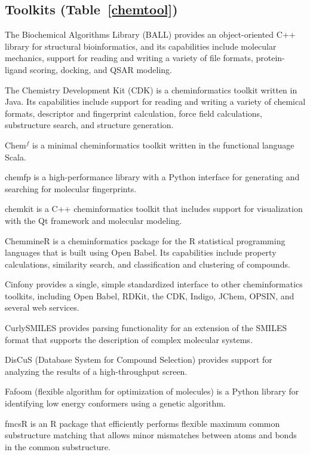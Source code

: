 \subsection*{Toolkits (Table~\ref{chemtool})} 
The Biochemical Algorithms Library (BALL) \cite{Hildebrandt_2010} provides an object-oriented C++ library for structural bioinformatics, and its capabilities include molecular mechanics, support for reading and writing a variety of file formats, protein-ligand scoring, docking, and QSAR modeling.

The Chemistry Development Kit (CDK) \cite{Steinbeck_2006} is a cheminformatics toolkit written in Java.  Its capabilities include support for reading and writing a variety of chemical formats, descriptor and fingerprint calculation, force field calculations, substructure search, and structure generation.

Chem$^f$ \cite{H_ck_2012} is a minimal cheminformatics toolkit written in the functional language Scala.

chemfp \cite{dalke2011chemfp} is a high-performance library with a Python interface for generating and searching for molecular fingerprints.

chemkit is a C++ cheminformatics toolkit that includes support for visualization with the Qt framework and molecular modeling.

ChemmineR \cite{Cao_2008}  is a cheminformatics package for the R statistical programming languages that is built using Open Babel. Its capabilities include property calculations, similarity search, and classification and clustering of compounds.

Cinfony \cite{cinfony} provides a single, simple standardized interface to other cheminformatics toolkits, including Open Babel, RDKit, the CDK, Indigo, JChem, OPSIN, and several web services.

CurlySMILES \cite{Drefahl_2011} provides parsing functionality for an extension of the SMILES format that supports the description of complex molecular systems.

DisCuS (Database System for Compound Selection) \cite{W_jcikowski_2014} provides support for analyzing the results of a high-throughput screen.

Fafoom (flexible algorithm for optimization of molecules) \cite{Supady_2015} is a Python library for identifying low energy conformers using a genetic algorithm.

fmcsR \cite{Goecks_2010} is an R package that efficiently performs flexible maximum common substructure matching that allows minor mismatches between atoms and bonds in the common substructure.

